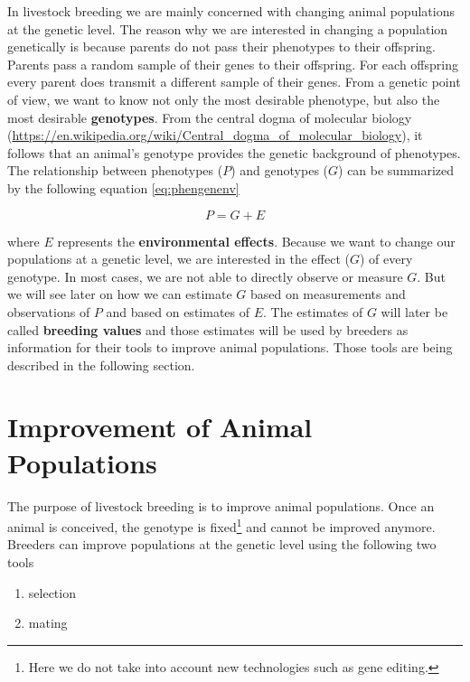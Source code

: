 \documentclass[
]{book}
\providecommand{\tightlist}{%
  \setlength{\itemsep}{0pt}\setlength{\parskip}{0pt}}
\theoremstyle{definition}
\theoremstyle{definition}
\theoremstyle{definition}
\theoremstyle{remark}
\begin{document}
In livestock breeding we are mainly concerned with changing animal populations at the genetic level. The reason why we are interested in changing a population genetically is because parents do not pass their phenotypes to their offspring. Parents pass a random sample of their genes to their offspring. For each offspring every parent does transmit a different sample of their genes. From a genetic point of view, we want to know not only the most desirable phenotype, but also the most desirable \textbf{genotypes}. From the central dogma of molecular biology (\url{https://en.wikipedia.org/wiki/Central_dogma_of_molecular_biology}), it follows that an animal's genotype provides the genetic background of phenotypes. The relationship between phenotypes (\(P\)) and genotypes (\(G\)) can be summarized by the following equation \eqref{eq:phengenenv}

\begin{equation}
P = G + E
\label{eq:phengenenv}
\end{equation}

where \(E\) represents the \textbf{environmental effects}. Because we want to change our populations at a genetic level, we are interested in the effect (\(G\)) of every genotype. In most cases, we are not able to directly observe or measure \(G\). But we will see later on how we can estimate \(G\) based on measurements and observations of \(P\) and based on estimates of \(E\). The estimates of \(G\) will later be called \textbf{breeding values} and those estimates will be used by breeders as information for their tools to improve animal populations. Those tools are being described in the following section.

\hypertarget{improvementanimalpopulations}{%
\section{Improvement of Animal Populations}\label{improvementanimalpopulations}}

The purpose of livestock breeding is to improve animal populations. Once an animal is conceived, the genotype is fixed\footnote{Here we do not take into account new technologies such as gene editing.} and cannot be improved anymore. Breeders can improve populations at the genetic level using the following two tools

\begin{enumerate}
\def\labelenumi{\arabic{enumi}.}
\tightlist
\item
  selection
\item
  mating
\end{enumerate}
\end{document}
